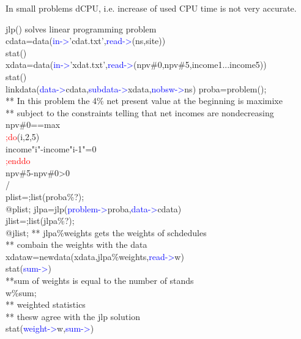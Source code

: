 \begin{note}
In small problems dCPU, i.e. increase of used CPU time is not very accurate.
\end{note}
\begin{example}[jlpex]jlp() solves linear programming problem\\
\label{jlpex}
cdata=\textcolor{VioletRed}{data}(\textcolor{blue}{in->}'cdat.txt',\textcolor{blue}{read->}(ns,site))\\
\textcolor{VioletRed}{stat}()\\
xdata=\textcolor{VioletRed}{data}(\textcolor{blue}{in->}'xdat.txt',\textcolor{blue}{read->}(npv\#0,npv\#5,income1...income5))\\
\textcolor{VioletRed}{stat}()\\
\textcolor{VioletRed}{linkdata}(\textcolor{blue}{data->}cdata,\textcolor{blue}{subdata->}xdata,\textcolor{blue}{nobsw->}ns)
proba=\textcolor{VioletRed}{problem}();\\
** In this problem the 4\% net present value at the beginning is maximixe\\
** subject to the constraints telling that net incomes are nondecreasing\\
npv\#0==max\\
\textcolor{Red}{;do}(i,2,5)\\
income"i"-income"i-1"=0\\
\textcolor{Red}{;enddo}\\
npv\#5-npv\#0>0\\
/\\
plist=;list(proba\%?);\\
@plist;
jlpa=\textcolor{VioletRed}{jlp}(\textcolor{blue}{problem->}proba,\textcolor{blue}{data->}cdata)\\
jlist=;list(jlpa\%?);\\
@jlist;
** jlpa\%weights gets the weights of schdedules\\
** combain the weights with the data\\
xdataw=\textcolor{VioletRed}{newdata}(xdata,jlpa\%weights,\textcolor{blue}{read->}w)\\
\textcolor{VioletRed}{stat}(\textcolor{blue}{sum->})\\
**sum of weights is equal to the number of stands\\
w\%sum;\\
** weighted statistics\\
** thesw agree with the jlp solution\\
\textcolor{VioletRed}{stat}(\textcolor{blue}{weight->}w,\textcolor{blue}{sum->})\\

\end{example}
